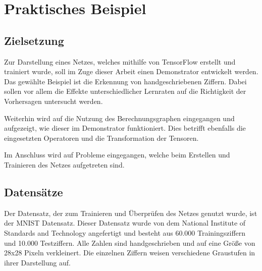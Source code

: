 \chapter{Praktisches Beispiel}
\label{chap:praktischesBeispiel}
\section{Zielsetzung}
\label{sec:zielsetzung}
\printsubchapterauthor{\authorMarco}
Zur Darstellung eines Netzes, welches mithilfe von TensorFlow erstellt und trainiert wurde, soll im Zuge dieser Arbeit einen Demonstrator entwickelt werden. Das gewählte Beispiel ist die Erkennung von handgeschriebenen Ziffern. Dabei sollen vor allem die Effekte unterschiedlicher Lernraten auf die Richtigkeit der Vorhersagen untersucht werden.

Weiterhin wird auf die Nutzung des Berechnungsgraphen eingegangen und aufgezeigt, wie dieser im Demonstrator funktioniert. Dies betrifft ebenfalls die eingesetzten Operatoren und die Transformation der Tensoren.

Im Anschluss wird auf Probleme eingegangen, welche beim Erstellen und Trainieren des Netzes aufgetreten sind.

\section{Datensätze}
\label{sec:datensaetze}
\printsubchapterauthor{\authorMarco}
Der Datensatz, der zum Trainieren und Überprüfen des Netzes genutzt wurde, ist der MNIST Datensatz. Dieser Datensatz wurde von dem National Institute of Standards and Technology angefertigt und besteht aus 60.000 Trainingsziffern und 10.000 Testziffern. Alle Zahlen sind handgeschrieben und auf eine Größe von 28x28 Pixeln verkleinert. Die einzelnen Ziffern weisen verschiedene Graustufen in ihrer Darstellung auf.

